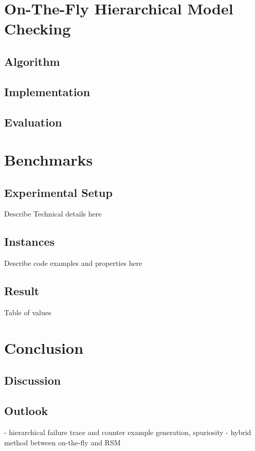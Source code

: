 \documentclass[a4paper, 12pt, twoside]{report}
\theoremstyle{plain}
\begin{document}
	
	\chapter{On-The-Fly Hierarchical Model Checking}
	\section{Algorithm}
	\section{Implementation}
	\section{Evaluation}
	
	\chapter{Benchmarks}	
	\section{Experimental Setup}
	Describe Technical details here
	\section{Instances}
	Describe code examples and properties here
	\section{Result}
	Table of values
	
	\chapter{Conclusion}
	\section{Discussion}	
	\section{Outlook}
	
		- hierarchical failure trace and counter example generation, spuriosity
	- hybrid method between on-the-fly and RSM
	
	
	{}
	
\end{document}
